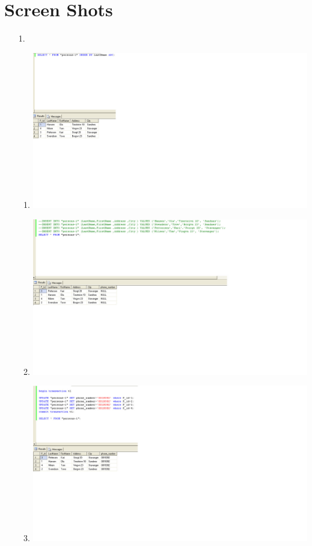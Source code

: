 \documentclass{article}
\begin{document}
\section{Screen Shots}
\begin{enumerate}
	\item[1.]
		\begin{enumerate}
			\item
				\includegraphics[scale=0.5]{figs/im-2.jpg}
			\item
				\includegraphics[scale=0.5]{figs/im-3.jpg}
			\item
				\includegraphics[scale=0.5]{figs/im-4.jpg}

\end{enumerate}
\end{enumerate}
\end{document}
